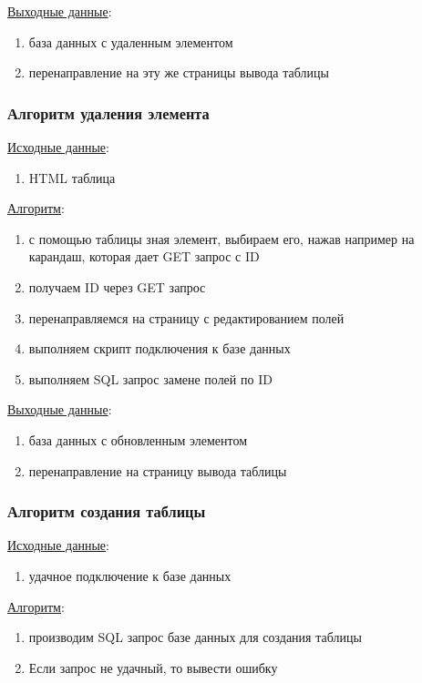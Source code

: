 \underline{Выходные данные}:
\begin{enumerate}
    \item база данных с удаленным элементом
    \item перенаправление на эту же страницы вывода таблицы
\end{enumerate}


\subsubsection*{Алгоритм удаления элемента}

\underline{Исходные данные}:
\begin{enumerate}
    \item HTML таблица
\end{enumerate}

\underline{Алгоритм}:
\begin{enumerate}
    \item с помощью таблицы зная элемент, выбираем его, нажав например на карандаш, которая дает GET запрос с ID
    \item получаем ID через GET запрос
    \item перенаправляемся на страницу с редактированием полей
    \item выполняем скрипт подключения к базе данных
    \item выполняем SQL запрос замене полей по ID
\end{enumerate}

\underline{Выходные данные}:
\begin{enumerate}
    \item база данных с обновленным элементом
    \item перенаправление на страницу вывода таблицы
\end{enumerate}


\subsubsection*{Алгоритм создания таблицы}

\underline{Исходные данные}:
\begin{enumerate}
    \item удачное подключение к базе данных
\end{enumerate}

\underline{Алгоритм}:
\begin{enumerate}
    \item производим SQL запрос базе данных для создания таблицы
    \item Если запрос не удачный, то вывести ошибку
\end{enumerate}

